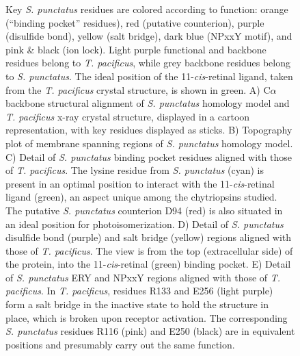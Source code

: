 \begin{figure}[hb]
  \caption[Structural details of the \textit{S. punctatus} chytriopsin homology model.]{Key \textit{S. punctatus} residues are colored according to function: orange (“binding pocket” residues), red (putative counterion), purple (disulfide bond), yellow (salt bridge), dark blue (NPxxY motif), and pink \& black (ion lock). Light purple functional and backbone residues belong to \textit{T. pacificus}, while grey backbone residues belong to \textit{S. punctatus}. The ideal position of the 11-\textit{cis}-retinal ligand, taken from the \textit{T. pacificus} crystal structure, is shown in green. A) C$\alpha$ backbone structural alignment of \textit{S. punctatus} homology model and \textit{T. pacificus} x-ray crystal structure, displayed in a cartoon representation, with key residues displayed as sticks. B) Topography plot of membrane spanning regions of \textit{S. punctatus} homology model. C) Detail of \textit{S. punctatus} binding pocket residues aligned with those of \textit{T. pacificus}. The lysine residue from \textit{S. punctatus} (cyan) is present in an optimal position to interact with the 11-\textit{cis}-retinal ligand (green), an aspect unique among the chytriopsins studied. The putative \textit{S. punctatus} counterion D94 (red) is also situated in an ideal position for photoisomerization. D) Detail of \textit{S. punctatus} disulfide bond (purple) and salt bridge (yellow) regions aligned with those of \textit{T. pacificus}. The view is from the top (extracellular side) of the protein, into the 11-\textit{cis}-retinal (green) binding pocket. E) Detail of \textit{S. punctatus} ERY and NPxxY regions aligned with those of \textit{T. pacificus}. In \textit{T. pacificus}, residues R133 and E256 (light purple) form a salt bridge in the inactive state to hold the structure in place, which is broken upon receptor activation. The corresponding \textit{S. punctatus} residues R116 (pink) and E250 (black) are in equivalent positions and presumably carry out the same function.}
  \label{fig:ChRhod_SpStructure}
\end{figure}

